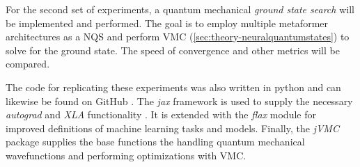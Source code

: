 For the second set of experiments, a quantum mechanical \emph{ground state search} will be implemented and performed.
The goal is to employ multiple metaformer architectures as a NQS and perform VMC (\autoref{sec:theory-neuralquantumstates}) to solve for the ground state.
The speed of convergence and other metrics will be compared.

The code for replicating these experiments was also written in python and can likewise be found on GitHub \cite{selfPhysics}.
The \emph{jax} framework is used to supply the necessary \emph{autograd} and \emph{XLA} functionality \cite{jaxGithub}.
It is extended with the \emph{flax} \cite{flaxGithub} module for improved definitions of machine learning tasks and models.
Finally, the \emph{jVMC} \cite{jVMCgithub} package supplies the base functions the handling quantum mechanical wavefunctions and performing optimizations with VMC.
